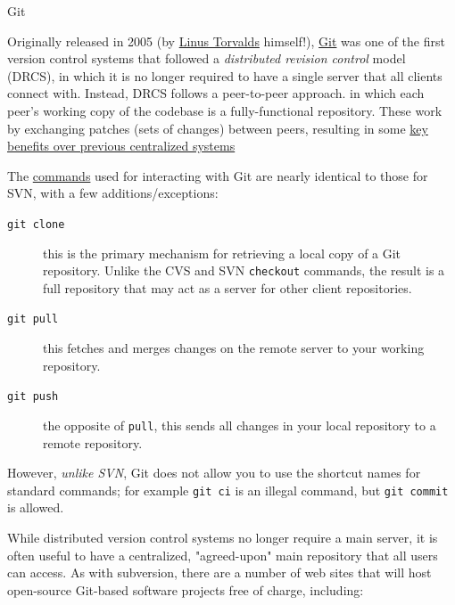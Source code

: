 \documentclass[aspectratio=169]{beamer}
\begin{document}
\begin{frame}{Git}

Originally released in 2005 (by
\href{https://en.wikipedia.org/wiki/Linus_Torvalds}{Linus Torvalds}
himself!), \href{https://en.wikipedia.org/wiki/Git_(software)}{Git} was
one of the first version control systems that followed a
\emph{distributed revision control} model (DRCS), in which it is no
longer required to have a single server that all clients connect with.
Instead, DRCS follows a peer-to-peer approach. in which each peer's
working copy of the codebase is a fully-functional repository. These
work by exchanging patches (sets of changes) between peers, resulting in
some
\href{https://en.wikipedia.org/wiki/Distributed_revision_control\#Distributed_vs._centralized}{key
benefits over previous centralized systems}

The
\href{https://confluence.atlassian.com/display/STASH/Basic+Git+commands}{commands}
used for interacting with Git are nearly identical to those for SVN,
with a few additions/exceptions:

\end{frame}

\begin{frame}{}

\begin{description}
\item[\texttt{git clone}] this is the primary mechanism for retrieving
  a local copy of a Git repository. Unlike the CVS and SVN
  \texttt{checkout} commands, the result is a full repository that may
  act as a server for other client repositories.
\item[\texttt{git pull}] this fetches and merges changes on the remote
  server to your working repository.
\item[\texttt{git push}] the opposite of \texttt{pull}, this sends all
  changes in your local repository to a remote repository.
\end{description}

\end{frame}

\begin{frame}{}

However, \emph{unlike SVN}, Git does not allow you to use the shortcut
names for standard commands; for example \texttt{git ci} is an illegal
command, but \texttt{git commit} is allowed.

While distributed version control systems no longer require a main
server, it is often useful to have a centralized, "agreed-upon" main
repository that all users can access. As with subversion, there are a
number of web sites that will host open-source Git-based software
projects free of charge, including:

\end{frame}
\end{document}

